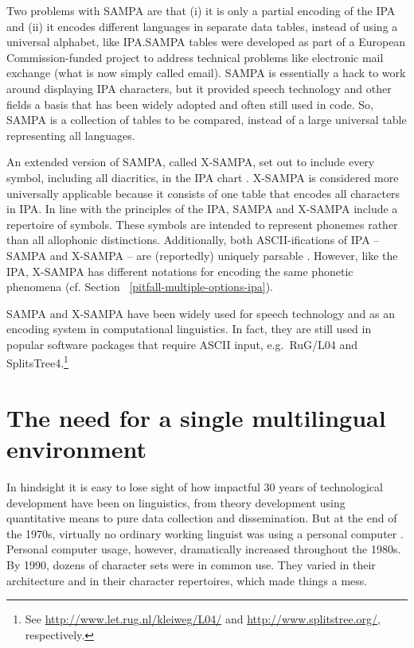 Two problems with SAMPA are that (i) it is only a partial encoding of the IPA
and (ii) it encodes different languages in separate data tables, instead of
using a universal alphabet, like IPA.\@ SAMPA tables were developed as part of a
European Commission-funded project to address technical problems like electronic
mail exchange (what is now simply called email). SAMPA is essentially a hack to
work around displaying IPA characters, but it provided speech technology and
other fields a basis that has been widely adopted and often still used in code.
So, SAMPA is a collection of tables to be compared, instead of a large universal
table representing all languages. 

An extended version of SAMPA, called X-SAMPA, set out to include every symbol,
including all diacritics, in the IPA chart \citep{Wells1995}. X-SAMPA is
considered more universally applicable because it consists of one table that
encodes all characters in IPA. In line with the principles of the IPA, SAMPA and
X-SAMPA include a repertoire of symbols. These symbols are intended to represent
phonemes rather than all allophonic distinctions. Additionally, both
ASCII-ifications of IPA -- SAMPA and X-SAMPA -- are
(reportedly) uniquely parsable \citep{Wells1995}. However, like the IPA, X-SAMPA
has different notations for encoding the same phonetic phenomena (cf. Section~
\ref{pitfall-multiple-options-ipa}).

SAMPA and X-SAMPA have been widely used for speech technology and as an encoding
system in computational linguistics. In fact, they are still used in popular
software packages that require ASCII input, e.g.~RuG/L04 and SplitsTree4.\footnote{See
\url{http://www.let.rug.nl/kleiweg/L04/} and \url{http://www.splitstree.org/},
respectively.}


\section{The need for a single multilingual environment}
\label{need-for-multilingual-environment}

In hindsight it is easy to lose sight of how impactful 30 years of technological
development have been on linguistics, from theory development using quantitative
means to pure data collection and dissemination. But at the end of the 1970s,
virtually no ordinary working linguist was using a personal computer
\citep{Simons1996}. Personal computer usage, however, dramatically increased
throughout the 1980s. By 1990, dozens of character sets were in common use. They
varied in their architecture and in their character repertoires, which made
things a mess. 

